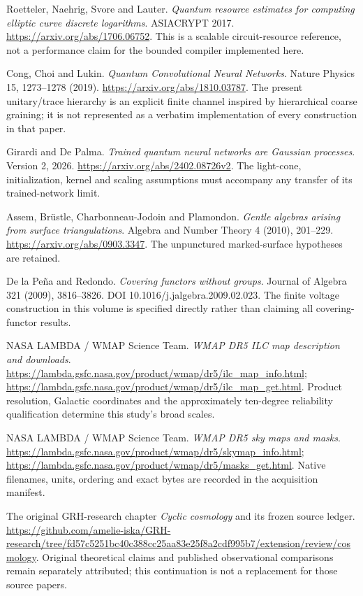 \documentclass[11pt,oneside,openany]{book}
\begin{document}
\begin{description}[leftmargin=2.6em,labelwidth=2em]
\item[E1] Roetteler, Naehrig, Svore and Lauter. \emph{Quantum resource estimates for computing elliptic curve discrete logarithms}. ASIACRYPT 2017. \url{https://arxiv.org/abs/1706.06752}. This is a scalable circuit-resource reference, not a performance claim for the bounded compiler implemented here.
\item[Q1] Cong, Choi and Lukin. \emph{Quantum Convolutional Neural Networks}. Nature Physics 15, 1273--1278 (2019). \url{https://arxiv.org/abs/1810.03787}. The present unitary/trace hierarchy is an explicit finite channel inspired by hierarchical coarse graining; it is not represented as a verbatim implementation of every construction in that paper.
\item[Q2] Girardi and De Palma. \emph{Trained quantum neural networks are Gaussian processes}. Version 2, 2026. \url{https://arxiv.org/abs/2402.08726v2}. The light-cone, initialization, kernel and scaling assumptions must accompany any transfer of its trained-network limit.
\item[G1] Assem, Br\"ustle, Charbonneau-Jodoin and Plamondon. \emph{Gentle algebras arising from surface triangulations}. Algebra and Number Theory 4 (2010), 201--229. \url{https://arxiv.org/abs/0903.3347}. The unpunctured marked-surface hypotheses are retained.
\item[G2] De la Pe\~na and Redondo. \emph{Covering functors without groups}. Journal of Algebra 321 (2009), 3816--3826. DOI 10.1016/j.jalgebra.2009.02.023. The finite voltage construction in this volume is specified directly rather than claiming all covering-functor results.
\item[C1] NASA LAMBDA / WMAP Science Team. \emph{WMAP DR5 ILC map description and downloads}. \url{https://lambda.gsfc.nasa.gov/product/wmap/dr5/ilc_map_info.html}; \url{https://lambda.gsfc.nasa.gov/product/wmap/dr5/ilc_map_get.html}. Product resolution, Galactic coordinates and the approximately ten-degree reliability qualification determine this study's broad scales.
\item[C2] NASA LAMBDA / WMAP Science Team. \emph{WMAP DR5 sky maps and masks}. \url{https://lambda.gsfc.nasa.gov/product/wmap/dr5/skymap_info.html}; \url{https://lambda.gsfc.nasa.gov/product/wmap/dr5/masks_get.html}. Native filenames, units, ordering and exact bytes are recorded in the acquisition manifest.
\item[C3] The original GRH-research chapter \emph{Cyclic cosmology} and its frozen source ledger. \url{https://github.com/amelie-iska/GRH-research/tree/fd57c5251bc40c388cc25aa83e25f8a2cdf995b7/extension/review/cosmology}. Original theoretical claims and published observational comparisons remain separately attributed; this continuation is not a replacement for those source papers.
\end{description}
\end{document}
